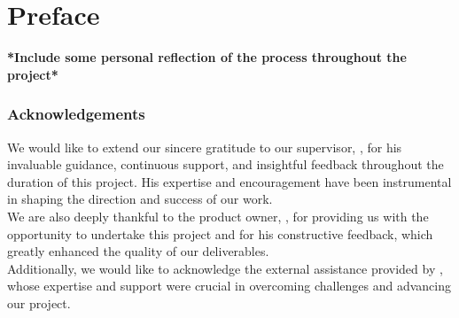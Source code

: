 \chapter*{Preface}

\textbf{*Include some personal reflection of the process throughout the project*}

\subsection*{Acknowledgements}

We would like to extend our sincere gratitude to our supervisor, \textbf{\saleh}, for his invaluable guidance, continuous support, and insightful feedback throughout the duration of this project. His expertise and encouragement have been instrumental in shaping the direction and success of our work. \\

We are also deeply thankful to the product owner, \textbf{\arne}, for providing us with the opportunity to undertake this project and for his constructive feedback, which greatly enhanced the quality of our deliverables. \\

Additionally, we would like to acknowledge the external assistance provided by \textbf{\peter}, whose expertise and support were crucial in overcoming challenges and advancing our project.